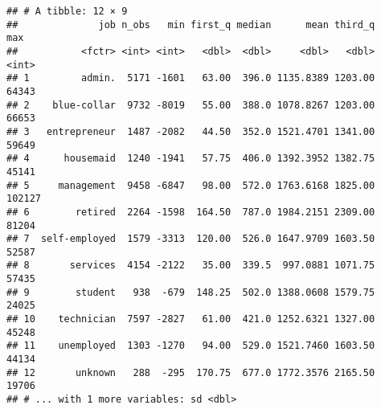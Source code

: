 \documentclass[]{book}
\newenvironment{Shaded}{\begin{snugshade}}{\end{snugshade}}
\newcommand{\KeywordTok}[1]{\textcolor[rgb]{0.13,0.29,0.53}{\textbf{{#1}}}}
\newcommand{\DataTypeTok}[1]{\textcolor[rgb]{0.13,0.29,0.53}{{#1}}}
\newcommand{\FloatTok}[1]{\textcolor[rgb]{0.00,0.00,0.81}{{#1}}}
\newcommand{\StringTok}[1]{\textcolor[rgb]{0.31,0.60,0.02}{{#1}}}
\newcommand{\CommentTok}[1]{\textcolor[rgb]{0.56,0.35,0.01}{\textit{{#1}}}}
\newcommand{\OtherTok}[1]{\textcolor[rgb]{0.56,0.35,0.01}{{#1}}}
\newcommand{\NormalTok}[1]{{#1}}
\begin{document}
\begin{Shaded}
\end{Shaded}

\begin{verbatim}
## # A tibble: 12 × 9
##              job n_obs   min first_q median      mean third_q    max
##           <fctr> <int> <int>   <dbl>  <dbl>     <dbl>   <dbl>  <int>
## 1         admin.  5171 -1601   63.00  396.0 1135.8389 1203.00  64343
## 2    blue-collar  9732 -8019   55.00  388.0 1078.8267 1203.00  66653
## 3   entrepreneur  1487 -2082   44.50  352.0 1521.4701 1341.00  59649
## 4      housemaid  1240 -1941   57.75  406.0 1392.3952 1382.75  45141
## 5     management  9458 -6847   98.00  572.0 1763.6168 1825.00 102127
## 6        retired  2264 -1598  164.50  787.0 1984.2151 2309.00  81204
## 7  self-employed  1579 -3313  120.00  526.0 1647.9709 1603.50  52587
## 8       services  4154 -2122   35.00  339.5  997.0881 1071.75  57435
## 9        student   938  -679  148.25  502.0 1388.0608 1579.75  24025
## 10    technician  7597 -2827   61.00  421.0 1252.6321 1327.00  45248
## 11    unemployed  1303 -1270   94.00  529.0 1521.7460 1603.50  44134
## 12       unknown   288  -295  170.75  677.0 1772.3576 2165.50  19706
## # ... with 1 more variables: sd <dbl>
\end{verbatim}
\end{document}

